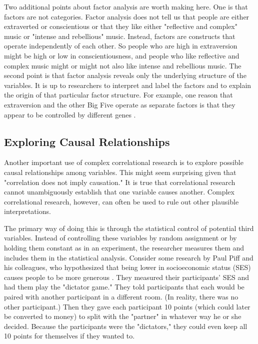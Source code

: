 Two additional points about factor analysis are worth making here. One is that factors are not categories. Factor analysis does not tell us that people are either extraverted or conscientious or that they like either "reflective and complex" music or "intense and rebellious" music. Instead, factors are constructs that operate independently of each other. So people who are high in extraversion might be high or low in conscientiousness, and people who like reflective and complex music might or might not also like intense and rebellious music. The second point is that factor analysis reveals only the underlying structure of the variables. It is up to researchers to interpret and label the factors and to explain the origin of that particular factor structure. For example, one reason that extraversion and the other Big Five operate as separate factors is that they appear to be controlled by different genes \citep{plomin_behavioral_2008}.

\subsection{Exploring Causal Relationships}

Another important use of complex correlational research is to explore possible causal relationships among variables. This might seem surprising given that "correlation does not imply causation." It is true that correlational research cannot unambiguously establish that one variable causes another. Complex correlational research, however, can often be used to rule out other plausible interpretations.

The primary way of doing this is through the statistical control of potential third variables. Instead of controlling these variables by random assignment or by holding them constant as in an experiment, the researcher measures them and includes them in the statistical analysis. Consider some research by Paul Piff and his colleagues, who hypothesized that being lower in socioeconomic status (SES) causes people to be more generous \citep{piff_having_2010}. They measured their participants' SES and had them play the "dictator game." They told participants that each would be paired with another participant in a different room. (In reality, there was no other participant.) Then they gave each participant 10 points (which could later be converted to money) to split with the "partner" in whatever way he or she decided. Because the participants were the "dictators," they could even keep all 10 points for themselves if they wanted to.


